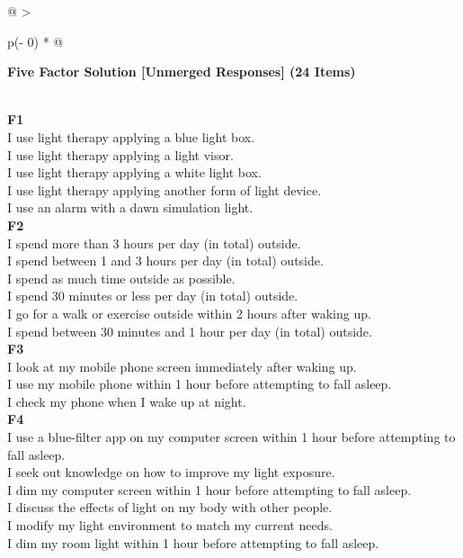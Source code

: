 \documentclass[
  english,
  man]{apa6}
\begin{document}
\begin{appendix}
\begin{longtable}[]{@{}
  >{\raggedright\arraybackslash}p{(\columnwidth - 0\tabcolsep) * }@{}}
\toprule
\begin{minipage}[b]{\linewidth}\raggedright
\textbf{Five Factor Solution {[}Unmerged Responses{]} (24 Items)}
\end{minipage} \\
\midrule
\endhead
\textbf{F1} \\
I use light therapy applying a blue light box. \\
I use light therapy applying a light visor. \\
I use light therapy applying a white light box. \\
I use light therapy applying another form of light device. \\
I use an alarm with a dawn simulation light. \\
\textbf{F2} \\
I spend more than 3 hours per day (in total) outside. \\
I spend between 1 and 3 hours per day (in total) outside. \\
I spend as much time outside as possible. \\
I spend 30 minutes or less per day (in total) outside. \\
I go for a walk or exercise outside within 2 hours after waking up. \\
I spend between 30 minutes and 1 hour per day (in total) outside. \\
\textbf{F3} \\
I look at my mobile phone screen immediately after waking up. \\
I use my mobile phone within 1 hour before attempting to fall asleep. \\
I check my phone when I wake up at night. \\
\textbf{F4} \\
I use a blue-filter app on my computer screen within 1 hour before
attempting to fall asleep. \\
I seek out knowledge on how to improve my light exposure. \\
I dim my computer screen within 1 hour before attempting to fall
asleep. \\
I discuss the effects of light on my body with other people. \\
I modify my light environment to match my current needs. \\
I dim my room light within 1 hour before attempting to fall asleep. \\

\end{longtable}
\end{appendix}
\end{document}
